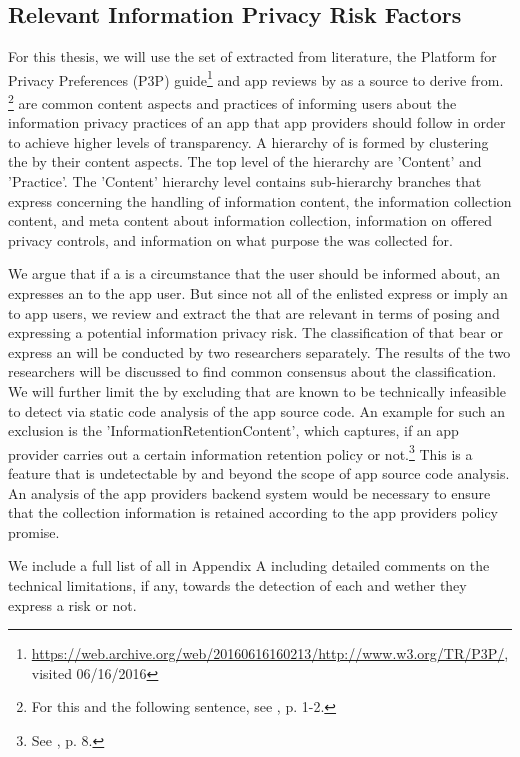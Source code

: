 \subsection{Relevant Information Privacy Risk Factors}\label{chapter:Relevant}

For this thesis, we will use the set of \ipp extracted from literature, the Platform for Privacy Preferences (\acs{P3P}) guide\footnote{\url{https://web.archive.org/web/20160616160213/http://www.w3.org/TR/P3P/}, visited 06/16/2016} and app reviews by \cite{Dehling2016} as a source to derive \iprfs from. \footnote{For this and the following sentence, see \cite{Dehling2016}, p. 1-2.} 
\Ipp are common content aspects and practices of informing users about the information privacy practices of an app that app providers should follow in order to achieve higher levels of transparency.
A hierarchy of \ipp is formed by clustering the \ipp by their content aspects. 
The top level of the hierarchy are 'Content' and 'Practice'.
The 'Content' hierarchy level contains sub-hierarchy branches that express \ipp concerning the handling of information content, the information collection content, and meta content about information collection, information on offered privacy controls, and information on what purpose the \ipp was collected for.

We argue that if a \ipp is a circumstance that the user should be informed about, an \ipp expresses an \ipr to the app user.
But since not all of the enlisted \ipp express or imply an \ipr to app users, we review and extract the \ipp that are relevant in terms of posing and expressing a potential information privacy risk.
The classification of \ipp that bear or express an \ipr will be conducted by two researchers separately.
The results of the two researchers will be discussed to find common consensus about the classification.
We will further limit the \ipp by excluding \ipp that are known to be technically infeasible to detect via static code analysis of the app source code.
An example for such an exclusion is the \ipp 'InformationRetentionContent', which captures, if an app provider carries out a certain information retention policy or not.\footnote{See \cite{Dehling2016}, p. 8.}
This is a feature that is undetectable by \sca and beyond the scope of app source code analysis.
An analysis of the app providers backend system would be necessary to ensure that the collection information is retained according to the app providers policy promise.

We include a full list of all \ipp in Appendix A including detailed comments on the technical limitations, if any, towards the \sca detection of each \ipp and wether they express a risk or not.

